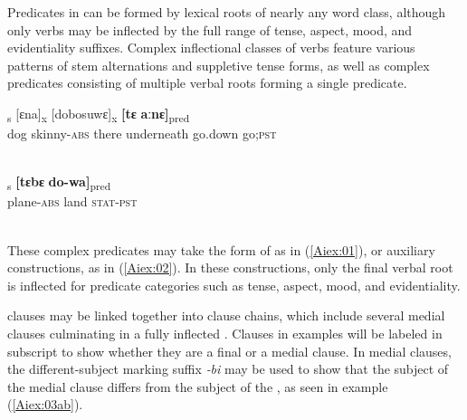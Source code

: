 \documentclass[output=paper]{LSP/langsci}
\begin{document}
Predicates in  can be formed by lexical roots of nearly any word class, although only verbs may be inflected by the full range of tense, aspect, mood, and evidentiality suffixes. Complex inflectional classes of verbs feature various patterns of stem alternations and suppletive tense forms, as well as complex predicates consisting of multiple verbal roots forming a single predicate. 

\begin{exe}
\ex \label{Aiex:01}
\textsubscript{s} [ɛna]\textsubscript{x} [dobosuwɛ]\textsubscript{x} \textbf{[tɛ} 	\textbf{aːnɛ]}\textsubscript{pred}\\
dog	skinny-\textsc{abs}	there	underneath	go.down 	go\textsc{;pst}\\
\glt {}\\
\end{exe}


\begin{exe}
\ex \label{Aiex:02}
\gll [sobolo-wa]\textsubscript{s} \textbf{[tɛbɛ} 	 \textbf{do-wa]}\textsubscript{pred}\\
plane-\textsc{abs}	land	\textsc{stat}-\textsc{pst}\\
\glt {}\\
\end{exe}



These complex predicates may take the form of  as in (\ref{Aiex:01}), or auxiliary constructions, as in (\ref{Aiex:02}). In these constructions, only the final verbal root is inflected for predicate categories such as tense, aspect, mood, and evidentiality.

 clauses may be linked together into clause chains, which include several medial clauses culminating in a fully inflected . Clauses in examples will be labeled in subscript to show whether they are a final or a medial clause. In medial clauses, the different-subject marking suffix \textit{‑bi} may be used to show that the subject of the medial clause differs from the subject of the , as seen in example (\ref{Aiex:03ab}).
\end{document}
